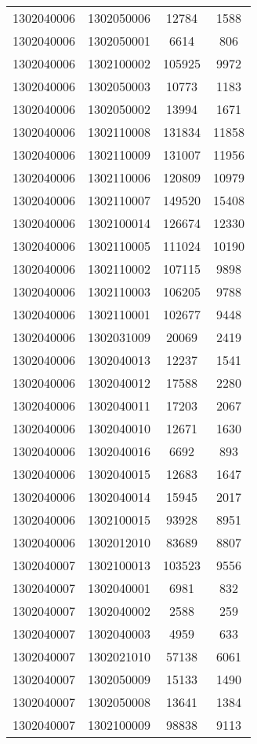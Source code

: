 \begin{longtable}[h]{llcc}
		1302040006 & 1302050006 & 12784 & 1588\\
		1302040006 & 1302050001 & 6614 & 806\\
		1302040006 & 1302100002 & 105925 & 9972\\
		1302040006 & 1302050003 & 10773 & 1183\\
		1302040006 & 1302050002 & 13994 & 1671\\
		1302040006 & 1302110008 & 131834 & 11858\\
		1302040006 & 1302110009 & 131007 & 11956\\
		1302040006 & 1302110006 & 120809 & 10979\\
		1302040006 & 1302110007 & 149520 & 15408\\
		1302040006 & 1302100014 & 126674 & 12330\\
		1302040006 & 1302110005 & 111024 & 10190\\
		1302040006 & 1302110002 & 107115 & 9898\\
		1302040006 & 1302110003 & 106205 & 9788\\
		1302040006 & 1302110001 & 102677 & 9448\\
		1302040006 & 1302031009 & 20069 & 2419\\
		1302040006 & 1302040013 & 12237 & 1541\\
		1302040006 & 1302040012 & 17588 & 2280\\
		1302040006 & 1302040011 & 17203 & 2067\\
		1302040006 & 1302040010 & 12671 & 1630\\
		1302040006 & 1302040016 & 6692 & 893\\
		1302040006 & 1302040015 & 12683 & 1647\\
		1302040006 & 1302040014 & 15945 & 2017\\
		1302040006 & 1302100015 & 93928 & 8951\\
		1302040006 & 1302012010 & 83689 & 8807\\
		1302040007 & 1302100013 & 103523 & 9556\\
		1302040007 & 1302040001 & 6981 & 832\\
		1302040007 & 1302040002 & 2588 & 259\\
		1302040007 & 1302040003 & 4959 & 633\\
		1302040007 & 1302021010 & 57138 & 6061\\
		1302040007 & 1302050009 & 15133 & 1490\\
		1302040007 & 1302050008 & 13641 & 1384\\
		1302040007 & 1302100009 & 98838 & 9113\\

\end{longtable}
